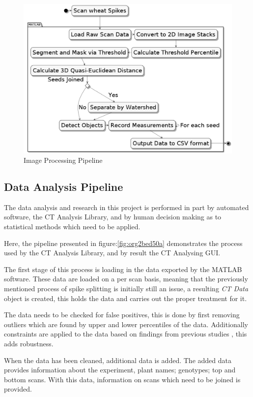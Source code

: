 \documentclass[11pt]{report}
\begin{document}
\begin{figure}[htbp]
\centering
\includegraphics[width=13cm]{./images/matlab.png}
\caption{\label{fig:org8fe543d}
Image Processing Pipeline}
\end{figure}

\subsection{Data Analysis Pipeline}
\label{sec:orgbe693c5}
The data analysis and research in this project is performed in part by automated software, the CT Analysis Library, and by human decision making as to statistical methods which need to be applied.

Here, the pipeline presented in figure:\ref{fig:org2bed50a} demonstrates the process used by the CT Analysis Library, and by result the CT Analysing GUI.

The first stage of this process is loading in the data exported by the MATLAB software. These data are loaded on a per scan basis, meaning that the previously mentioned process of spike splitting is initially still an issue, a resulting \emph{CT Data} object is created, this holds the data and carries out the proper treatment for it.

The data needs to be checked for false positives, this is done by first removing outliers which are found by upper and lower percentiles of the data. Additionally constraints are applied to the data based on findings from previous studies \cite{Hughes2017}, this adds robustness.

When the data has been cleaned, additional data is added. The added data provides information about the experiment, plant names; genotypes; top and bottom scans. With this data, information on scans which need to be joined is provided.
\end{document}
